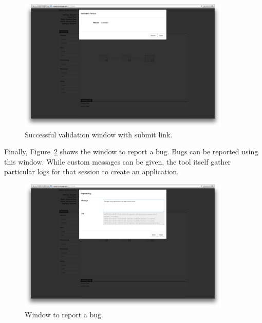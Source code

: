 \begin{figure}[ht]
	\centering
	\includegraphics[width=0.9\textwidth]{figures/tool/panel12.png}
	\caption{Successful validation window with submit link.}
	\label{fig:panel12}
\end{figure}

Finally, Figure~\ref{fig:panel13} shows the window to report a bug. Bugs can be 
reported using this window. While custom messages can be given, the tool itself 
gather particular logs for that session to create an application.

\begin{figure}[ht]
	\centering
	\includegraphics[width=0.9\textwidth]{figures/tool/panel13.png}
	\caption{Window to report a bug.}
	\label{fig:panel13}
\end{figure}
